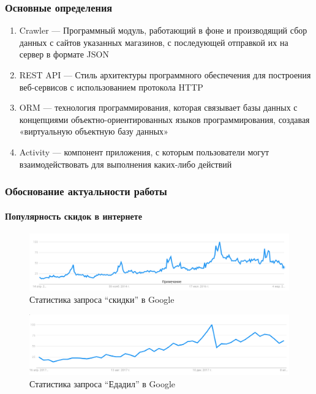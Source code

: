 \documentclass{beamer}
\begin{document}
\begin{frame}
\frametitle{Основные определения}
	\begin{enumerate}
        \item Crawler --- Программный модуль, работающий в фоне и производящий
              сбор данных с сайтов указанных магазинов, с последующей отправкой
              их на сервер в формате JSON
        \item REST API --- Стиль архитектуры программного обеспечения для
              построения веб-сервисов с использованием протокола HTTP
        \item ORM --- технология программирования, которая связывает базы
              данных с концепциями объектно-ориентированных языков программирования,
              создавая «виртуальную объектную базу данных»
        \item Activity --- компонент приложения, с
              которым пользователи могут взаимодействовать для выполнения
              каких-либо действий
	\end{enumerate}
\end{frame}

\begin{frame}[c]
    \frametitle{Обоснование актуальности работы}
    \framesubtitle{Популярность скидок в интернете}
    \begin{figure}
        \includegraphics[width=\columnwidth]{trend.png}
        \captionsetup{labelformat=empty}
        \caption{Статистика запроса ``скидки'' в Google}
    \end{figure}
    \begin{figure}
        \includegraphics[width=\columnwidth]{trend_edadeal.png}
        \captionsetup{labelformat=empty}
        \caption{Статистика запроса ``Едадил'' в Google}
    \end{figure}
\end{frame}
\end{document}
